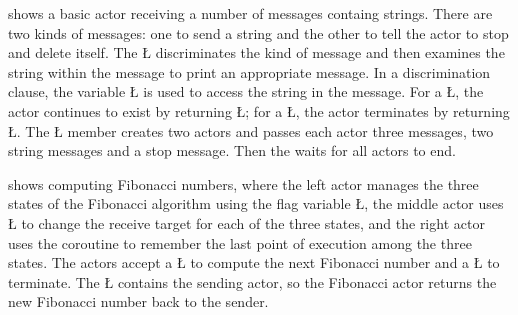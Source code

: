 \documentclass[openright,twoside]{report}
\begin{document}
 shows a basic actor receiving a number of messages containg strings.
There are two kinds of messages: one to send a string and the other to tell the actor to stop and delete itself.
The \LGinlinetrue\LGbegin\lgrinde\L{}\endlgrinde\LGend{} discriminates the kind of message and then examines the string within the message to print an appropriate message.
In a discrimination clause, the variable \LGinlinetrue\LGbegin\lgrinde\L{}\endlgrinde\LGend{} is used to access the string in the message.
For a \LGinlinetrue\LGbegin\lgrinde\L{}\endlgrinde\LGend{}, the actor continues to exist by returning \LGinlinetrue\LGbegin\lgrinde\L{}\endlgrinde\LGend{};
for a \LGinlinetrue\LGbegin\lgrinde\L{}\endlgrinde\LGend{}, the actor terminates by returning \LGinlinetrue\LGbegin\lgrinde\L{}\endlgrinde\LGend{}.
The \LGinlinetrue\LGbegin\lgrinde\L{}\endlgrinde\LGend{} member creates two actors and passes each actor three messages, two string messages and a stop message.
Then the  waits for all actors to end.

 shows computing Fibonacci numbers, where the left actor manages the three states of the Fibonacci algorithm using the flag variable \LGinlinetrue\LGbegin\lgrinde\L{}\endlgrinde\LGend{}, the middle actor uses \LGinlinetrue\LGbegin\lgrinde\L{}\endlgrinde\LGend{} to change the receive target for each of the three states, and the right actor uses the coroutine to remember the last point of execution among the three states.
The actors accept a \LGinlinetrue\LGbegin\lgrinde\L{}\endlgrinde\LGend{} to compute the next Fibonacci number and a \LGinlinetrue\LGbegin\lgrinde\L{}\endlgrinde\LGend{} to terminate.
The \LGinlinetrue\LGbegin\lgrinde\L{}\endlgrinde\LGend{} contains the sending actor, so the Fibonacci actor returns the new Fibonacci number back to the sender.
\end{document}
